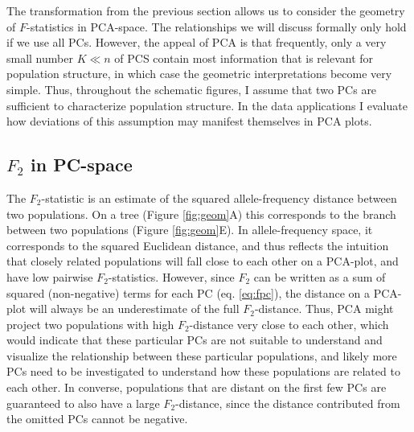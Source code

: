 \documentclass[12pt,fullpage, a4paper]{article}
\begin{document}
The transformation from the previous section allows us to consider the geometry of $F$-statistics in PCA-space. The relationships we will discuss formally only hold if we use all PCs. However, the appeal of PCA is that frequently, only a very small number $K \ll n$ of PCS contain most information that is
relevant for population structure, in which case the geometric interpretations become very simple. Thus, throughout the schematic figures, I assume that two PCs are sufficient to characterize population structure. In the data applications I evaluate how deviations of this assumption may manifest themselves in PCA plots.

\subsection{$F_2$ in PC-space}
The $F_2$-statistic is an estimate of the squared allele-frequency distance between two
populations. On a tree (Figure \ref{fig:geom}A) this corresponds to the branch between two populations (Figure \ref{fig:geom}E). In allele-frequency space, it corresponds to the squared Euclidean distance, and thus reflects the intuition that closely related populations  will fall close to each other on a PCA-plot, and have low pairwise $F_2$-statistics. However, since $F_2$ can be written as  a sum of squared (non-negative) terms for each PC (eq. \ref{eq:fpc}), the distance on a PCA-plot will always be an underestimate of the full $F_2$-distance. Thus, PCA might project two populations with high $F_2$-distance very close to each other, which would indicate that these particular PCs are not suitable to  understand and visualize the relationship between these particular populations, and likely more PCs need to be investigated to understand how these populations are related to each other. In converse, populations that are distant on the first few PCs are guaranteed to also have a large $F_2$-distance, since the distance contributed from the omitted PCs cannot be negative.
\end{document}

